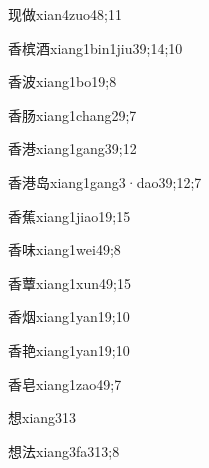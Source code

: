 \begin{verbete}{现做}{xian4zuo4}{8;11}
\end{verbete}
\begin{verbete}{香槟酒}{xiang1bin1jiu3}{9;14;10}
\end{verbete}
\begin{verbete}{香波}{xiang1bo1}{9;8}
\end{verbete}
\begin{verbete}{香肠}{xiang1chang2}{9;7}
\end{verbete}
\begin{verbete}{香港}{xiang1gang3}{9;12}
\end{verbete}
\begin{verbete}{香港岛}{xiang1gang3·dao3}{9;12;7}
\end{verbete}
\begin{verbete}{香蕉}{xiang1jiao1}{9;15}
\end{verbete}
\begin{verbete}{香味}{xiang1wei4}{9;8}
\end{verbete}
\begin{verbete}{香蕈}{xiang1xun4}{9;15}
\end{verbete}
\begin{verbete}{香烟}{xiang1yan1}{9;10}
\end{verbete}
\begin{verbete}{香艳}{xiang1yan1}{9;10}
\end{verbete}
\begin{verbete}{香皂}{xiang1zao4}{9;7}
\end{verbete}
\begin{verbete}{想}{xiang3}{13}
\end{verbete}
\begin{verbete}{想法}{xiang3fa3}{13;8}
\end{verbete}
